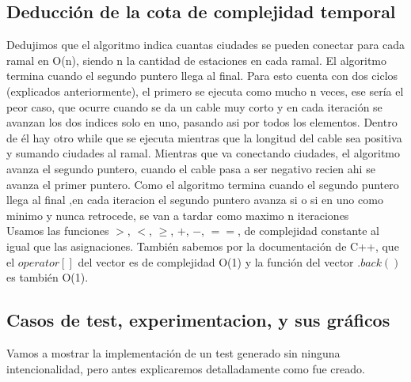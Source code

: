 \subsection{Deducción de la cota de complejidad temporal}

Dedujimos que el algoritmo indica cuantas ciudades se pueden conectar para cada ramal en O(n), siendo n la cantidad de estaciones en cada ramal. El algoritmo termina cuando el segundo puntero llega al final. Para esto cuenta con dos ciclos (explicados anteriormente), el primero se ejecuta como mucho n veces, ese sería el peor caso, que ocurre cuando se da un cable muy corto y en cada iteración se avanzan los dos indices solo en uno, pasando asi por todos los elementos. Dentro de él hay otro while que se ejecuta mientras que la longitud del cable sea positiva y sumando ciudades al ramal. Mientras que va conectando ciudades, el algoritmo avanza el segundo puntero, cuando el cable pasa a ser negativo recien ahi se avanza el primer puntero. Como el algoritmo termina cuando el segundo puntero llega al final ,en cada iteracion el segundo puntero avanza si o si en uno como minimo y nunca retrocede, se van a tardar como maximo n iteraciones \\

Usamos las funciones $>$, $<$, $\geq$, $+$, $-$, $==$, de complejidad constante al igual que las asignaciones. También sabemos por la documentación de C++, que el $operator[]$ del vector es de complejidad O(1) y la función del vector $.back()$ es también O(1).\\

\subsection{Casos de test, experimentacion, y sus gráficos}

Vamos a mostrar la implementación de un test generado sin ninguna intencionalidad, pero antes explicaremos detalladamente como fue creado. \\

